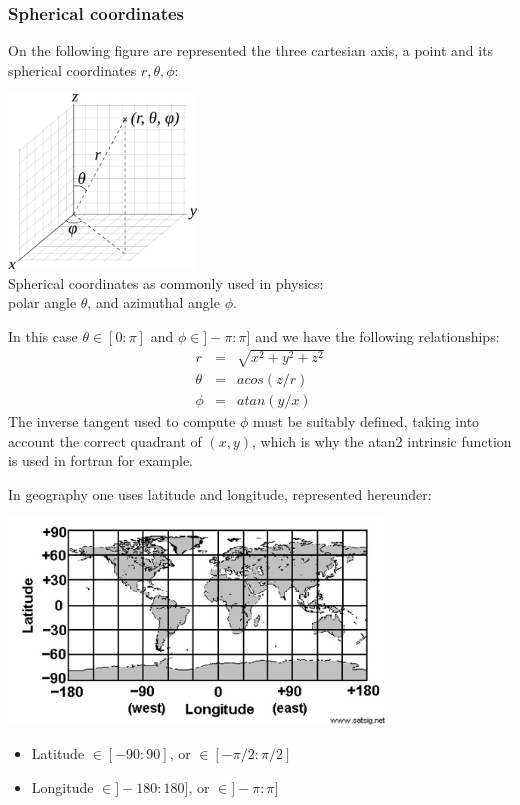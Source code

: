 \subsubsection{Spherical coordinates}

On the following figure are represented the three cartesian axis, 
a point and its spherical coordinates $r,\theta,\phi$:
\begin{center}
\includegraphics[width=5cm]{images/sphcoord}\\
{\captionfont Spherical coordinates as commonly used in physics:\\ polar angle $\theta$, and azimuthal angle $\phi$.} 
\end{center}
In this case $\theta\in[0:\pi]$ and $\phi\in]-\pi:\pi]$ and we have the following relationships:
\begin{eqnarray}
r &=& \sqrt{x^2+y^2+z^2} \\
\theta &=& acos (z/r) \\
\phi &=& atan (y/x) 
\end{eqnarray}
The inverse tangent used to compute $\phi$ must be suitably defined, taking into account the correct quadrant of $(x,y)$,
which is why the atan2 intrinsic function is used in fortran for example.    

In geography one uses latitude and longitude, represented hereunder:
\begin{center}
\includegraphics[width=10cm]{images/map.jpg}
\end{center}
\begin{itemize}
\item Latitude  $\in[-90:90]$,   or $\in[-\pi/2:\pi/2]$ 
\item Longitude $\in]-180:180]$, or $\in]-\pi:\pi]$ 
\end{itemize}

